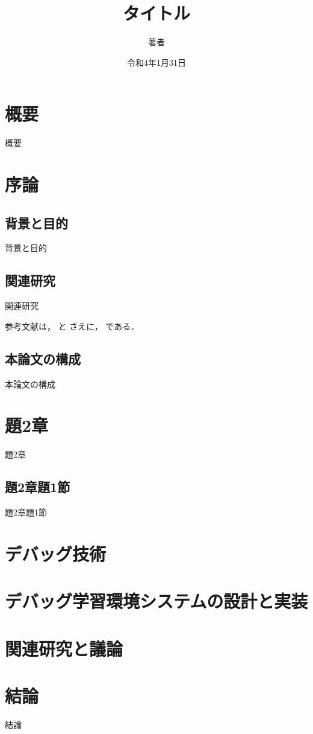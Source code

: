 \documentclass{jreport}
\title{タイトル}
\author{著者}{ID9999}
\date{令和4年1月31日}{令和4年1月}
\begin{document}
\maketitle


\chapter*{概要}
概要

\setcounter{tocdepth}{1}
\tableofcontents

\chapter{序論}
\section{背景と目的}
背景と目的

\section{関連研究}
関連研究

参考文献は，
\cite{bunken1}
と
\cite{bunken2}
さえに，
\cite{robobug:2017}
である．



\section{本論文の構成}
本論文の構成

\chapter{題2章}
題2章
\section{題2章題1節}
題2章題1節

\chapter{デバッグ技術}
\chapter{デバッグ学習環境システムの設計と実装}
\chapter{関連研究と議論}

\chapter{結論}
結論
\end{document}
